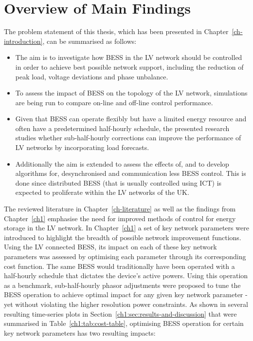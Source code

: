 \section{Overview of Main Findings}
\label{ch-conclusions:sec:main-findings}

The problem statement of this thesis, which has been presented in Chapter~\ref{ch-introduction}, can be summarised as follows:

\begin{itemize}
	\item
	The aim is to investigate how BESS in the LV network should be controlled in order to achieve best possible network support, including the reduction of peak load, voltage deviations and phase unbalance.
	\item 
	To assess the impact of BESS on the topology of the LV network, simulations are being run to compare on-line and off-line control performance.
	\item
	Given that BESS can operate flexibly but have a limited energy resource and often have a predetermined half-hourly schedule, the presented research studies whether sub-half-hourly corrections can improve the performance of LV networks by incorporating load forecasts.
	\item
	Additionally the aim is extended to assess the effects of, and to develop algorithms for, desynchronised and communication less BESS control.
	This is done since distributed BESS (that is usually controlled using ICT) is expected to proliferate within the LV networks of the UK.
\end{itemize}

The reviewed literature in Chapter~\ref{ch-literature} as well as the findings from Chapter~\ref{ch1} emphasise the need for improved methods of control for energy storage in the LV network.
In Chapter~\ref{ch1} a set of key network parameters were introduced to highlight the breadth of possible network improvement functions.
Using the LV connected BESS, its impact on each of these key network parameters was assessed by optimising each parameter through its corresponding cost function.
The same BESS would traditionally have been operated with a half-hourly schedule that dictates the device's active powers.
Using this operation as a benchmark, sub-half-hourly phasor adjustments were proposed to tune the BESS operation to achieve optimal impact for any given key network parameter - yet without violating the higher resolution power constraints.
As shown in several resulting time-series plots in Section~\ref{ch1:sec:results-and-discussion} that were summarised in Table~\ref{ch1:tab:cost-table}, optimising BESS operation for certain key network parameters has two resulting impacts:

